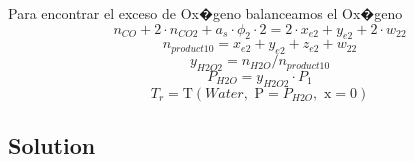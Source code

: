 \documentclass[10pt,fleqn]{article}
\newcommand{\F}[1]{\mbox{$#1$}}
\newcommand{\temperature}{\mathrm{T}}
\begin{document}
\vspace{0.10in}
\noindent
{\color{blue} \rm Para encontrar el exceso de Ox�geno balanceamos el Ox�geno}
\begin{equation}
\label{EES Eqn:46}
n_{CO} + 2\cdot n_{CO2} + a_{s}\cdot \phi_{2}\cdot 2 = 2\cdot x_{e2} + y_{e2} + 2\cdot w_{22} 
\end{equation}
\begin{equation}
\label{EES Eqn:47}
n_{product10} = x_{e2} + y_{e2} + z_{e2} + w_{22} 
\end{equation}
\begin{equation}
\label{EES Eqn:48}
y_{H2O2} = n_{H2O}/n_{product10} 
\end{equation}
\begin{equation}
\label{EES Eqn:49}
P_{H2O} = y_{H2O2} \cdot  P_{1} 
\end{equation}
\begin{equation}
\label{EES Eqn:50}
T_{r} = \temperature \left(\F{Water},\mbox{\ P}=P_{H2O},\mbox{\ x}=0 \right)  
\end{equation}

\subsection*{Solution}
\end{document}

